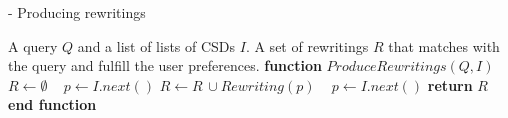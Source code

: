 
\begin{algorithm}
\caption{ - Producing rewritings}
\label{rewriting}
\begin{algorithmic}[1]
\REQUIRE A query $Q$ and a list of lists of CSDs $I$.
\ENSURE A set of rewritings $R$ that matches with the query and fulfill the user preferences.
\STATE \textbf{function} $\mathit{ProduceRewritings} (Q, I)$
	\STATE $R\leftarrow \emptyset$
	\STATE ~\! 
    \STATE $p \leftarrow I.next()$
			\STATE $R\leftarrow R\,\cup \mathit{Rewriting}(p)$
			\STATE ~\!
		\ENDIF
		\STATE $p \leftarrow I.\mathit{next}()$
	\ENDWHILE
    \STATE \textbf{return} $R$
\STATE \textbf{end function}
\end{algorithmic}
\end{algorithm}

